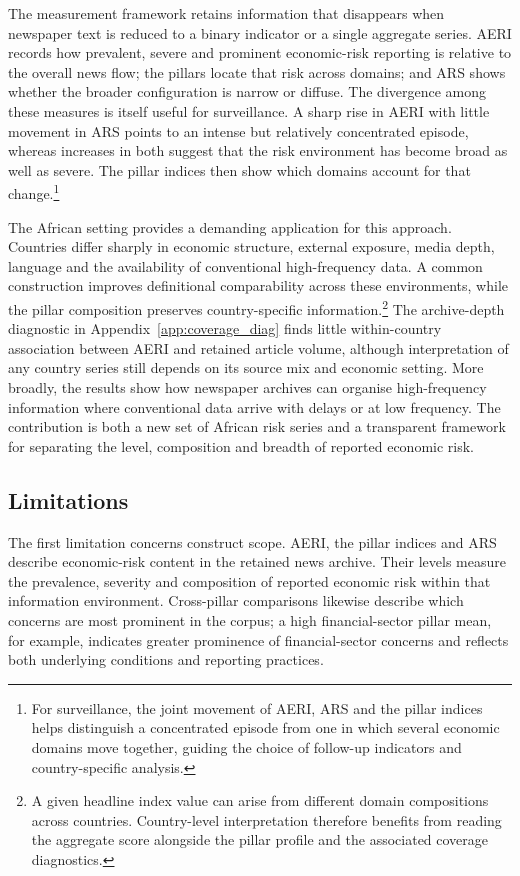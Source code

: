 \documentclass[12pt]{article}
\begin{document}
The measurement framework retains information that disappears when newspaper text is reduced to a binary indicator or a single aggregate series. AERI records how prevalent, severe and prominent economic-risk reporting is relative to the overall news flow; the pillars locate that risk across domains; and ARS shows whether the broader configuration is narrow or diffuse. The divergence among these measures is itself useful for surveillance. A sharp rise in AERI with little movement in ARS points to an intense but relatively concentrated episode, whereas increases in both suggest that the risk environment has become broad as well as severe. The pillar indices then show which domains account for that change.\footnote{For surveillance, the joint movement of AERI, ARS and the pillar indices helps distinguish a concentrated episode from one in which several economic domains move together, guiding the choice of follow-up indicators and country-specific analysis.}

The African setting provides a demanding application for this approach. Countries differ sharply in economic structure, external exposure, media depth, language and the availability of conventional high-frequency data. A common construction improves definitional comparability across these environments, while the pillar composition preserves country-specific information.\footnote{A given headline index value can arise from different domain compositions across countries. Country-level interpretation therefore benefits from reading the aggregate score alongside the pillar profile and the associated coverage diagnostics.} The archive-depth diagnostic in Appendix~\ref{app:coverage_diag} finds little within-country association between AERI and retained article volume, although interpretation of any country series still depends on its source mix and economic setting. More broadly, the results show how newspaper archives can organise high-frequency information where conventional data arrive with delays or at low frequency. The contribution is both a new set of African risk series and a transparent framework for separating the level, composition and breadth of reported economic risk.

\subsection{Limitations}\label{sec:limitations}
The first limitation concerns construct scope. AERI, the pillar indices and ARS describe economic-risk content in the retained news archive. Their levels measure the prevalence, severity and composition of reported economic risk within that information environment. Cross-pillar comparisons likewise describe which concerns are most prominent in the corpus; a high financial-sector pillar mean, for example, indicates greater prominence of financial-sector concerns and reflects both underlying conditions and reporting practices.
\end{document}
